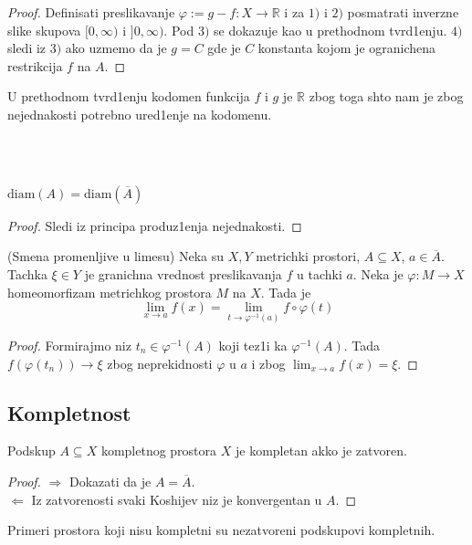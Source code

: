 \documentclass[a4paper,12pt]{article}
\newcommand{\RR}{\mathbb{R}}
\newcommand{\psj}{\subseteq}
\newcommand{\diam}{\mathrm{diam}}
\begin{document}
\begin{proof}
Definisati preslikavanje $\varphi := g - f : X \to \RR$ i za $1)$ i $2)$ posmatrati inverzne slike skupova $[0, \infty)$ i $]0, \infty)$. Pod $3)$ se dokazuje kao u prethodnom tvrd1enju. $4)$ sledi iz $3)$ ako uzmemo da je $g = C$ gde je $C$ konstanta kojom je ogranichena restrikcija $f$ na $A$.
\end{proof}

\begin{nap}
U prethodnom tvrd1enju kodomen funkcija $f$ i $g$ je $\RR$ zbog toga shto nam je zbog nejednakosti potrebno ured1enje na kodomenu.
\end{nap}
\\ \\
\begin{posl}
$\diam(A) = \diam(\overline{A})$
\end{posl}
\begin{proof}
Sledi iz principa produz1enja nejednakosti.
\end{proof}

\begin{tvr}
(Smena promenljive u limesu) Neka su $X, Y$ metrichki prostori, $A \psj X$, $a \in \overline{A}$. Tachka $\xi \in Y$ je granichna vrednost preslikavanja $f$ u tachki $a$. Neka je $\varphi: M \to X$ homeomorfizam metrichkog prostora $M$ na $X$. Tada je 
\[\lim_{x \to a} f(x) = \lim_{t \to {\varphi}^{-1}(a)} f \circ \varphi(t)\]
\end{tvr}
\begin{proof}
Formirajmo niz $t_n \in \varphi^{-1} (A)$ koji tez1i ka $\varphi^{-1}(A)$. Tada $f(\varphi(t_n)) \to \xi$ zbog neprekidnosti $\varphi$ u $a$ i zbog $\lim_{x \to a} f(x) = \xi$.
\end{proof}

\subsection{Kompletnost}

\begin{tvr}
Podskup $A \psj X$ kompletnog prostora $X$ je kompletan akko je zatvoren.
\end{tvr}
\begin{proof}
$\boxed{\Rightarrow}$ Dokazati da je $A = \overline{A}$.\\
$\boxed{\Leftarrow}$ Iz zatvorenosti svaki Koshijev niz je konvergentan u $A$.
\end{proof}

\begin{nap}
Primeri prostora koji nisu kompletni su nezatvoreni podskupovi kompletnih.
\end{nap}
\end{document}
